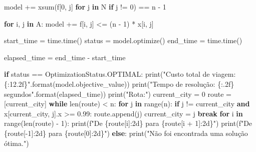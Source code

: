 \documentclass[
  letterpaper,
  DIV=11,
  numbers=noendperiod]{scrartcl}
\newenvironment{Shaded}{\begin{snugshade}}{\end{snugshade}}
\newcommand{\BuiltInTok}[1]{\textcolor[rgb]{0.00,0.23,0.31}{#1}}
\newcommand{\ControlFlowTok}[1]{\textcolor[rgb]{0.00,0.23,0.31}{\textbf{#1}}}
\newcommand{\DecValTok}[1]{\textcolor[rgb]{0.68,0.00,0.00}{#1}}
\newcommand{\FloatTok}[1]{\textcolor[rgb]{0.68,0.00,0.00}{#1}}
\newcommand{\KeywordTok}[1]{\textcolor[rgb]{0.00,0.23,0.31}{\textbf{#1}}}
\newcommand{\NormalTok}[1]{\textcolor[rgb]{0.00,0.23,0.31}{#1}}
\newcommand{\OperatorTok}[1]{\textcolor[rgb]{0.37,0.37,0.37}{#1}}
\newcommand{\SpecialCharTok}[1]{\textcolor[rgb]{0.37,0.37,0.37}{#1}}
\newcommand{\SpecialStringTok}[1]{\textcolor[rgb]{0.13,0.47,0.30}{#1}}
\newcommand{\StringTok}[1]{\textcolor[rgb]{0.13,0.47,0.30}{#1}}
\begin{document}
\begin{Shaded}
\begin{Highlighting}[]
\NormalTok{    model }\OperatorTok{+=}\NormalTok{ xsum(f[}\DecValTok{0}\NormalTok{, j] }\ControlFlowTok{for}\NormalTok{ j }\KeywordTok{in}\NormalTok{ N }\ControlFlowTok{if}\NormalTok{ j }\OperatorTok{!=} \DecValTok{0}\NormalTok{) }\OperatorTok{==}\NormalTok{ n }\OperatorTok{{-}} \DecValTok{1}

    \ControlFlowTok{for}\NormalTok{ i, j }\KeywordTok{in}\NormalTok{ A:}
\NormalTok{        model }\OperatorTok{+=}\NormalTok{ f[i, j] }\OperatorTok{\textless{}=}\NormalTok{ (n }\OperatorTok{{-}} \DecValTok{1}\NormalTok{) }\OperatorTok{*}\NormalTok{ x[i, j]}

\NormalTok{    start\_time }\OperatorTok{=}\NormalTok{ time.time()}
\NormalTok{    status }\OperatorTok{=}\NormalTok{ model.optimize()}
\NormalTok{    end\_time }\OperatorTok{=}\NormalTok{ time.time()}
    
\NormalTok{    elapsed\_time }\OperatorTok{=}\NormalTok{ end\_time }\OperatorTok{{-}}\NormalTok{ start\_time    }

    \ControlFlowTok{if}\NormalTok{ status }\OperatorTok{==}\NormalTok{ OptimizationStatus.OPTIMAL:}
        \BuiltInTok{print}\NormalTok{(}\StringTok{"Custo total de viagem: }\SpecialCharTok{\{:12.2f\}}\StringTok{"}\NormalTok{.}\BuiltInTok{format}\NormalTok{(model.objective\_value))}
        \BuiltInTok{print}\NormalTok{(}\StringTok{"Tempo de resolução: }\SpecialCharTok{\{:.2f\}}\StringTok{ segundos"}\NormalTok{.}\BuiltInTok{format}\NormalTok{(elapsed\_time))}
        \BuiltInTok{print}\NormalTok{(}\StringTok{"Rota:"}\NormalTok{)}
\NormalTok{        current\_city }\OperatorTok{=} \DecValTok{0}
\NormalTok{        route }\OperatorTok{=}\NormalTok{ [current\_city]}
        \ControlFlowTok{while} \BuiltInTok{len}\NormalTok{(route) }\OperatorTok{\textless{}}\NormalTok{ n:}
            \ControlFlowTok{for}\NormalTok{ j }\KeywordTok{in} \BuiltInTok{range}\NormalTok{(n):}
                \ControlFlowTok{if}\NormalTok{ j }\OperatorTok{!=}\NormalTok{ current\_city }\KeywordTok{and}\NormalTok{ x[current\_city, j].x }\OperatorTok{\textgreater{}=} \FloatTok{0.99}\NormalTok{:}
\NormalTok{                    route.append(j)}
\NormalTok{                    current\_city }\OperatorTok{=}\NormalTok{ j}
                    \ControlFlowTok{break}
        \ControlFlowTok{for}\NormalTok{ i }\KeywordTok{in} \BuiltInTok{range}\NormalTok{(}\BuiltInTok{len}\NormalTok{(route) }\OperatorTok{{-}} \DecValTok{1}\NormalTok{):}
            \BuiltInTok{print}\NormalTok{(}\SpecialStringTok{f"De }\SpecialCharTok{\{}\NormalTok{route[i]}\SpecialCharTok{:2d\}}\SpecialStringTok{ para }\SpecialCharTok{\{}\NormalTok{route[i }\OperatorTok{+} \DecValTok{1}\NormalTok{]}\SpecialCharTok{:2d\}}\SpecialStringTok{"}\NormalTok{)}
        \BuiltInTok{print}\NormalTok{(}\SpecialStringTok{f"De }\SpecialCharTok{\{}\NormalTok{route[}\OperatorTok{{-}}\DecValTok{1}\NormalTok{]}\SpecialCharTok{:2d\}}\SpecialStringTok{ para }\SpecialCharTok{\{}\NormalTok{route[}\DecValTok{0}\NormalTok{]}\SpecialCharTok{:2d\}}\SpecialStringTok{"}\NormalTok{)}
    \ControlFlowTok{else}\NormalTok{:}
        \BuiltInTok{print}\NormalTok{(}\StringTok{"Não foi encontrada uma solução ótima."}\NormalTok{)}
\end{Highlighting}
\end{Shaded}
\end{document}
